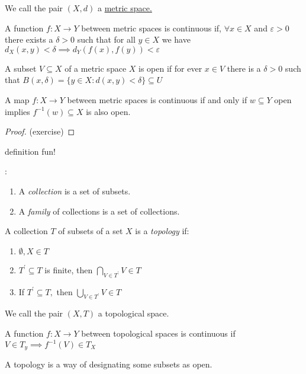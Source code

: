 We call the pair $(X, d)$ a \underline{metric space.}

\begin{definition}
A function $f : X \to Y$ between metric spaces is continuous if, $\forall x \in X$ and $\varepsilon >0 $ there exists a $\delta >0$ such that for all $y \in X$ we have $d_X (x, y) < \delta \implies d_Y(f(x), f(y)) < \varepsilon$	
\end{definition}

A subset $V \subseteq X$ of a metric space $X$ is open if for ever $x \in V$ there is a $\delta >0 $ such that $B(x,\delta) = \{y \in X: d(x,y) < \delta\} \subseteq U$ 

\begin{theorem}
	A map $f:X \to Y$ between metric spaces is continuous if and only if $w \subseteq Y$ open implies $f^{-1}(w) \subseteq X$ is also open.
\end{theorem}

\begin{proof}
	(exercise)
\end{proof}

definition fun! \\
\begin{definition}:
\begin{enumerate}
	\item A \emph{collection} is a set of subsets. 
	\item A \emph{family} of collections is a set of collections.
\end{enumerate}
\end{definition}

\begin{definition}[Topology]
	A collection $T$ of subsets of a set $X$ is a \textit{topology} if:
	\begin{enumerate}
		\item $\emptyset, X \in T$ 
		\item $T^{'} \subseteq T$ is finite, then $\bigcap\limits_{V \in T^{'}} V \in T$ 
		\item If $T^{'} \subseteq T,$ then $\bigcup\limits_{V \in T^{'}} V \in T$
	\end{enumerate}

	We call the pair $(X, T)$ a topological space.
\end{definition}


A function $f:X \to Y$ between topological spaces is continuous if $V \in T_y \implies f^{-1}(V) \in T_X$

\begin{claim*}
	A topology is a way of designating some subsets as open.	
\end{claim*}

